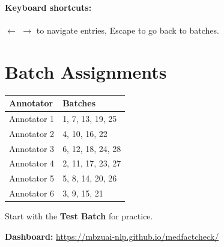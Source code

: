 \documentclass{article}
\begin{document}
\paragraph{Keyboard shortcuts:} $\leftarrow$ $\rightarrow$ to navigate entries, Escape to go back to batches.


\section{Batch Assignments}
\label{sec:batches}

\begin{center}
\begin{tabular}{@{}ll@{}}
\toprule
\textbf{Annotator} & \textbf{Batches} \\
\midrule
Annotator 1 & 1, 7, 13, 19, 25 \\
Annotator 2 & 4, 10, 16, 22 \\
Annotator 3 & 6, 12, 18, 24, 28 \\
Annotator 4 & 2, 11, 17, 23, 27 \\
Annotator 5 & 5, 8, 14, 20, 26 \\
Annotator 6 & 3, 9, 15, 21 \\
\bottomrule
\end{tabular}
\end{center}

Start with the \textbf{Test Batch} for practice.

\medskip
\noindent\textbf{Dashboard:} \url{https://mbzuai-nlp.github.io/medfactcheck/}
\end{document}
